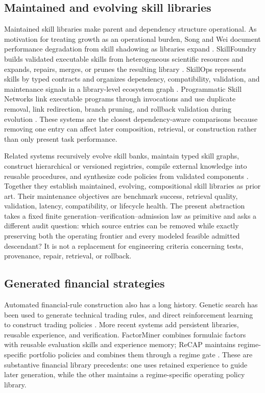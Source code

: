 \subsection{Maintained and evolving skill libraries}

Maintained skill libraries make parent and dependency structure operational.
As motivation for treating growth as an operational burden, Song and Wei
document performance degradation from skill shadowing as libraries expand
\cite{SongWei2026SkillShadowing}.
SkillFoundry builds validated executable skills from heterogeneous scientific
resources and expands, repairs, merges, or prunes the resulting library
\cite{ShenEtAl2026SkillFoundry}.  SkillOps represents skills by typed contracts
and organizes dependency, compatibility, validation, and maintenance signals
in a library-level ecosystem graph \cite{PuSongZhao2026SkillOps}.
Programmatic Skill Networks link executable programs through invocations and
use duplicate removal, link redirection, branch pruning, and rollback
validation during evolution \cite{ShiYuanLiu2026PSN}.  These systems are the
closest dependency-aware comparisons because removing one entry can affect
later composition, retrieval, or construction rather than only present task
performance.

Related systems recursively evolve skill banks, maintain typed skill graphs,
construct hierarchical or versioned registries, compile external knowledge
into reusable procedures, and synthesize code policies from validated
components
\cite{XiaEtAl2026SkillRL,LiEtAl2026SkillGraph,WangEtAl2026SkillX,%
PanEtAl2026Anything2Skill,ChunEtAl2026FCGraft}.  Together they establish
maintained, evolving, compositional skill libraries as prior art.  Their
maintenance objectives are benchmark success, retrieval quality, validation,
latency, compatibility, or lifecycle health.  The present abstraction takes a
fixed finite generation--verification--admission law as primitive and asks a
different audit question: which source entries can be removed while exactly
preserving both the operating frontier and every modeled feasible admitted
descendant?  It is not a replacement for engineering criteria concerning
tests, provenance, repair, retrieval, or rollback.

\subsection{Generated financial strategies}

Automated financial-rule construction also has a long history.  Genetic
search has been used to generate technical trading rules, and direct
reinforcement learning to construct trading policies
\cite{AllenKarjalainen1999,MoodySaffell2001}.  More recent systems add
persistent libraries, reusable experience, and verification.  FactorMiner
combines formulaic factors with reusable evaluation skills and experience
memory; ReCAP maintains regime-specific portfolio policies and combines them
through a regime gate
\cite{WangEtAl2026FactorMiner,PanEtAl2026ReCAP}.  These are substantive
financial library precedents: one uses retained experience to guide later
generation, while the other maintains a regime-specific operating policy
library.

